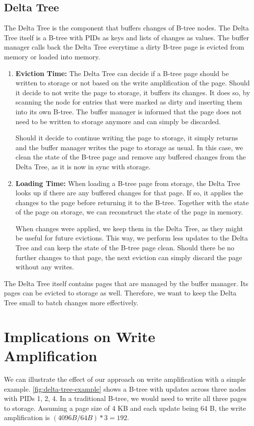 \subsection*{Delta Tree}
The Delta Tree is the component that buffers changes of B-tree nodes.
The Delta Tree itself is a B-tree with \ac{PID}s as keys and lists of changes as values.
The buffer manager calls back the Delta Tree everytime a dirty B-tree page is evicted from memory or loaded into memory.

\begin{enumerate}
  \item \textbf{Eviction Time:}
The Delta Tree can decide if a B-tree page should be written to storage or not based on the write amplification of the page.
Should it decide to not write the page to storage, it buffers its changes.
It does so, by scanning the node for entries that were marked as dirty and inserting them into its own B-tree.
The buffer manager is informed that the page does not need to be written to storage anymore and can simply be discarded.

Should it decide to continue writing the page to storage, it simply returns and the buffer manager writes the page to storage as usual.
In this case, we clean the state of the B-tree page and remove any buffered changes from the Delta Tree, as it is now in sync with storage.

  \item \textbf{Loading Time:}
When loading a B-tree page from storage, the Delta Tree looks up if there are any buffered changes for that page.
If so, it applies the changes to the page before returning it to the B-tree.
Together with the state of the page on storage, we can reconstruct the state of the page in memory.

When changes were applied, we keep them in the Delta Tree, as they might be useful for future evictions.
This way, we perform less updates to the Delta Tree and can keep the state of the B-tree page clean.
Should there be no further changes to that page, the next eviction can simply discard the page without any writes.
\end{enumerate}

The Delta Tree itself contains pages that are managed by the buffer manager.
Its pages can be evicted to storage as well.
Therefore, we want to keep the Delta Tree small to batch changes more effectively.

\section{Implications on Write Amplification}
We can illustrate the effect of our approach on write amplification with a simple example.
\autoref{fig:delta-tree-example} shows a B-tree with updates across three nodes with \ac{PID}s {1, 2, 4}.
In a traditional B-tree, we would need to write all three pages to storage.
Assuming a page size of 4 KB and each update being 64 B, the write amplification is $(4096 B / 64 B) * 3 = 192$.

